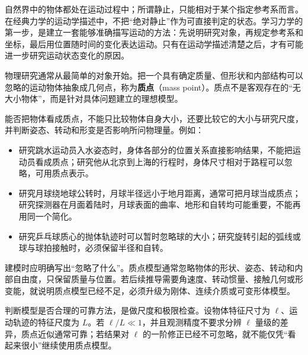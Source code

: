 
自然界中的物体都处在运动过程中；所谓静止，只能相对于某个指定参考系而言。在经典力学的运动学描述中，不把“绝对静止”作为可直接判定的状态。学习力学的第一步，是建立一套能够准确描写运动的方法：先说明研究对象，再规定参考系和坐标，最后用位置随时间的变化表达运动。只有在运动学描述清楚之后，才有可能进一步研究运动状态变化的原因。

物理研究通常从最简单的对象开始。把一个具有确定质量、但形状和内部结构可以忽略的运动物体抽象成几何点，称为\textbf{质点}（mass point）。质点不是客观存在的“无大小物体”，而是针对具体问题建立的理想模型。

能否把物体看成质点，不能只比较物体自身大小，还要比较它的大小与研究尺度，并判断姿态、转动和形变是否影响所问物理量。例如：

\begin{itemize}
  \item 研究跳水运动员入水姿态时，身体各部分的位置关系直接影响结果，不能把运动员看成质点；研究他从北京到上海的行程时，身体尺寸相对于路程可以忽略，可用质点表示。
  \item 研究月球绕地球公转时，月球半径远小于地月距离，通常可把月球当成质点；研究探测器在月面着陆时，月球表面的曲率、地形和自转均可能重要，不能再用同一个简化。
  \item 研究乒乓球质心的抛体轨迹时可以暂时忽略球的大小；研究旋转引起的弧线或球与球拍接触时，必须保留半径和自转。
\end{itemize}

\EarthMoonScaleDiagram

建模时应明确写出“忽略了什么”。质点模型通常忽略物体的形状、姿态、转动和内部自由度，只保留质量与位置。若后续推导需要角速度、转动惯量、接触几何或形变能，就说明质点模型已经不足，必须升级为刚体、连续介质或可变形体模型。

判断模型是否合理的可靠方法，是做尺度和极限检查。设物体特征尺寸为 $\ell$、运动轨迹的特征尺度为 $L$。若 $\ell/L\ll1$，并且观测精度不要求分辨 $\ell$ 量级的差异，质点近似通常可靠；若结果对 $\ell$ 的一阶修正已经不可忽略，就不能仅凭“看起来很小”继续使用质点模型。
